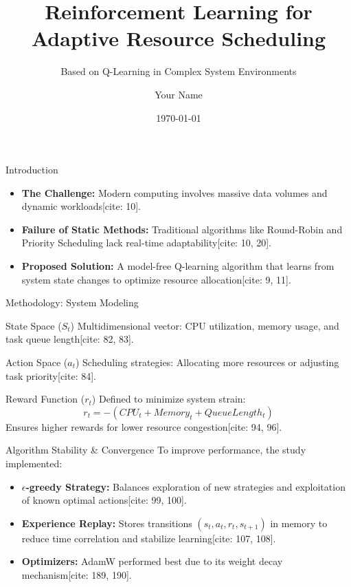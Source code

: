 \documentclass{beamer}
\title[RL for Resource Scheduling]{Reinforcement Learning for Adaptive Resource Scheduling}
\subtitle{Based on Q-Learning in Complex System Environments}
\author{Your Name}
\institute{IIIT Guwahati}
\date{\today}
\begin{document}
\begin{frame}
    \titlepage
\end{frame}

\begin{frame}{Introduction}
    \begin{itemize}
        \item \textbf{The Challenge:} Modern computing involves massive data volumes and dynamic workloads[cite: 10].
        \item \textbf{Failure of Static Methods:} Traditional algorithms like Round-Robin and Priority Scheduling lack real-time adaptability[cite: 10, 20].
        \item \textbf{Proposed Solution:} A model-free Q-learning algorithm that learns from system state changes to optimize resource allocation[cite: 9, 11].
    \end{itemize}
\end{frame}

\begin{frame}{Methodology: System Modeling}
    \begin{block}{State Space ($S_t$)}
        Multidimensional vector: CPU utilization, memory usage, and task queue length[cite: 82, 83].
    \end{block}
    \begin{block}{Action Space ($a_t$)}
        Scheduling strategies: Allocating more resources or adjusting task priority[cite: 84].
    \end{block}
    \begin{block}{Reward Function ($r_t$)}
        Defined to minimize system strain:
        $$r_t = -(CPU_t + Memory_t + QueueLength_t)$$
        Ensures higher rewards for lower resource congestion[cite: 94, 96].
    \end{block}
\end{frame}

\begin{frame}{Algorithm Stability \& Convergence}
    To improve performance, the study implemented:
    \begin{itemize}
        \item \textbf{$\epsilon$-greedy Strategy:} Balances exploration of new strategies and exploitation of known optimal actions[cite: 99, 100].
        \item \textbf{Experience Replay:} Stores transitions $(s_t, a_t, r_t, s_{t+1})$ in memory to reduce time correlation and stabilize learning[cite: 107, 108].
        \item \textbf{Optimizers:} AdamW performed best due to its weight decay mechanism[cite: 189, 190].
    \end{itemize}
\end{frame}
\end{document}
